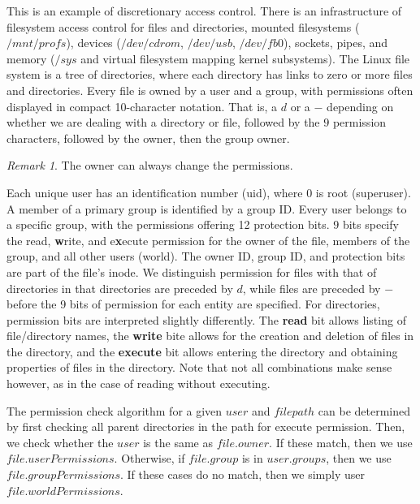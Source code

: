 \documentclass[11pt]{article}
\theoremstyle{plain} %
\theoremstyle{definition}
\theoremstyle{example}
\theoremstyle{remark}
\newtheorem*{remark}{Remark}
\begin{document}
This is an example of discretionary access control. There is an infrastructure of filesystem access control for files and directories, mounted filesystems ($/mnt/profs$), devices ($/dev/cdrom$, $/dev/usb$, $/dev/fb0$), sockets, pipes, and memory ($/sys$ and virtual filesystem mapping kernel subsystems). The Linux file system is a tree of directories, where each directory has links to zero or more files and directories. Every file is owned by a user and a group, with permissions often displayed in compact 10-character notation. That is, a $d$ or a $-$ depending on whether we are dealing with a directory or file, followed by the $9$ permission characters, followed by the owner, then the group owner. 
\begin{remark}
The owner can always change the permissions.
\end{remark}
Each unique user has an identification number (uid), where $0$ is root (superuser). A member of a primary group is identified by a group ID. Every user belongs to a specific group, with the permissions offering 12 protection bits. $9$ bits specify the \textbf{}read, \textbf{w}rite, and e\textbf{x}ecute permission for the owner of the file, members of the group, and all other users (world). The owner ID, group ID, and protection bits are part of the file's inode. We distinguish permission for files with that of directories in that directories are preceded by $d$, while files are preceded by $-$ before the 9 bits of permission for each entity are specified. For directories, permission bits are interpreted slightly differently. The \textbf{read} bit allows listing of file/directory names, the \textbf{write} bite allows for the creation and deletion of files in the directory, and the \textbf{execute} bit allows entering the directory and obtaining properties of files in the directory. Note that not all combinations make sense however, as in the case of reading without executing.

The permission check algorithm for a given $user$ and $filepath$ can be determined by first checking all parent directories in the path for execute permission. Then, we check whether the $user$ is the same as $file.owner$. If these match, then we use $file.userPermissions$. Otherwise, if $file.group$ is in $user.groups$, then we use $file.groupPermissions$. If these cases do no match, then we simply user $file.worldPermissions$.
\end{document}
